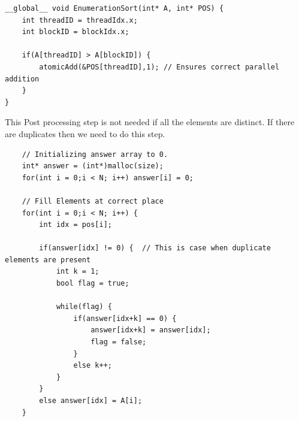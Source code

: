 
\begin{lstlisting}
__global__ void EnumerationSort(int* A, int* POS) {
    int threadID = threadIdx.x;
    int blockID = blockIdx.x;

    if(A[threadID] > A[blockID]) {
        atomicAdd(&POS[threadID],1); // Ensures correct parallel addition
    }
}
\end{lstlisting}

This Post processing step is not needed if all the elements are distinct. If there are duplicates then we need to do this step.

\begin{lstlisting}
    // Initializing answer array to 0.
    int* answer = (int*)malloc(size);
    for(int i = 0;i < N; i++) answer[i] = 0;

    // Fill Elements at correct place
    for(int i = 0;i < N; i++) {
        int idx = pos[i];

        if(answer[idx] != 0) {  // This is case when duplicate elements are present
            int k = 1;
            bool flag = true;

            while(flag) {
                if(answer[idx+k] == 0) {
                    answer[idx+k] = answer[idx];
                    flag = false;
                }
                else k++;
            }
        }
        else answer[idx] = A[i];
    }
\end{lstlisting}
